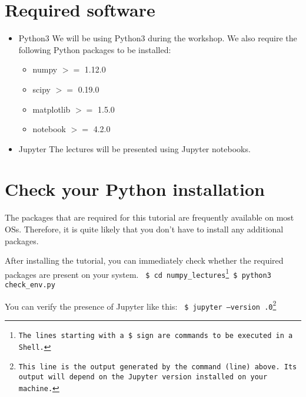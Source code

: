 \documentclass[11pt]{article}
\begin{document}
\section{Required software}
\begin{itemize}
  \item Python$3$ \newline
        We will be using Python$3$ during the workshop.
        We also require the following Python packages to be installed:
        \begin{itemize}
           \item numpy $>=$ 1.12.0 
           \item scipy $>=$ 0.19.0
           \item matplotlib $>=$ 1.5.0
           \item notebook $>=$ 4.2.0
        \end{itemize} 

  \item Jupyter \newline
        The lectures will be presented using Jupyter notebooks.
\end{itemize}


\section{Check your Python installation}\label{section:check}
The packages that are required for this tutorial are frequently available 
on most OSs.
Therefore, it is quite likely that you don't have to install any additional packages.

After installing the tutorial, you can immediately check whether the required packages 
are present on your system. \newline\newline
\texttt{
\$ cd numpy\_lectures\footnote{The lines starting with a \$ sign are commands to be executed in a Shell.} \newline
\$ python3 check\_env.py\newline
}

You can verify the presence of Jupyter like this:\newline\newline
\texttt{
\$ jupyter --version .0\footnote{This line is the output generated by the command (line) above.
Its output will depend on the Jupyter version installed on your machine.}\newline
}
\end{document}
